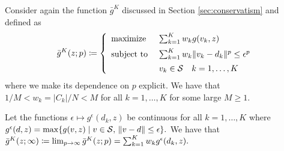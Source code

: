 Consider again the function $\bar g^K$ discussed in Section \ref{sec:conservatism} and defined as
\[
\bar g^K(z; p)
\defn
\left\{
\begin{array}{l@{~~~~}l}
	\mbox{maximize} & \sum_{k=1}^K w_k g(v_k, z) \\[0.5em]
     \mbox{subject to} & \sum_{k=1}^K w_k \norm{v_k-d_k}^p\leq \epsilon^p\\[0.5em]
          & v_k\in \supp \quad k = 1,\dots,K
\end{array}
\right.
\]
where we make its dependence on $p$ explicit.
We have that $1/M<w_k=|C_k|/N<M$ for all $k= 1,\dots, K$ for some large $M\geq 1$.

\begin{theorem}
  \label{thm:extreme-case-infinity}
  Let the functions $\epsilon \mapsto g^\epsilon(d_k, z)$ be continuous for all $k= 1,\dots, K$ where
\(
  g^{\epsilon}(d, z)= \max \{g(v, z) \mid v\in \mathcal{S},\,\| v-d \|\leq \epsilon\}.
\)
We have that
\(
  \bar g^K(z;\infty)\coloneqq\lim_{p\to\infty} \bar g^K(z;p) = \sum_{k=1}^K w_k g^{\epsilon}(d_k, z).
  \)
\end{theorem}
